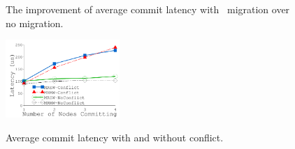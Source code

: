 {\begin{figure}[th]
\begin{minipage}{1.70in}
\begin{center}
{
The improvement of average commit latency with \on\ migration over no migration.
}
\end{center}
\end{minipage}
\begin{minipage}{0.01in}
\hspace{0.01in}
\end{minipage}
\begin{minipage}{1.7in}
\begin{center}
\centerline{\includegraphics[width=1.70in]{Figures/g_plot_SOCC_conflict.pdf}}
{
Average commit latency with and without conflict.
}
\end{center}
\end{minipage}
\end{figure}
}
